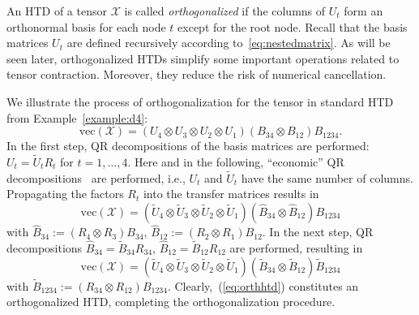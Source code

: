 \documentclass[11pt, a4paper]{article}
\newcommand{\calX}{\mathcal{X}}
\begin{document}
An HTD of a tensor $\calX$ is called \emph{orthogonalized} if the columns of $U_t$
form an orthonormal basis for each node $t$ except for the root node.
Recall that the basis matrices $U_t$ are defined recursively according to~\eqref{eq:nestedmatrix}.
As will be seen later, orthogonalized HTDs simplify some important operations related to tensor contraction. Moreover, they reduce the risk of numerical cancellation.

We illustrate the process of orthogonalization for the tensor in standard
HTD from Example~\ref{example:d4}:
\[\text{vec}(\calX) = 
(U_4\otimes U_3  \otimes U_2\otimes U_1) (B_{34}\otimes B_{12})  B_{1234}.\]
In the first step, QR decompositions of the basis matrices are performed:
$U_t = \widetilde U_t R_t$ for $t = 1,\ldots,4$. Here and in the following, ``economic'' QR
decompositions~\cite{GolV96} are performed, i.e., $U_t$ and $\widetilde U_t$ have the same
number of columns. Propagating the factors $R_t$ into the transfer matrices
results in
\[
\text{vec}(\calX) = 
(\widetilde U_4\otimes \widetilde U_3 \otimes \widetilde U_2\otimes \widetilde U_1) (\widehat B_{34} \otimes \widehat B_{12})  B_{1234}
\]
with $\widehat B_{34} := (R_4\otimes R_3) B_{34}$, $\widehat B_{12} := (R_2\otimes R_1) B_{12}$. In the next step,
QR decompositions $\widehat B_{34} = \widetilde B_{34} R_{34}$,
$\widehat B_{12} = \widetilde B_{12} R_{12}$ are performed, resulting in 
\begin{equation} \label{eq:orthhtd}
\text{vec}(\calX) = 
(\widetilde U_4\otimes \widetilde U_3  \otimes \widetilde U_2\otimes \widetilde U_1) (\widetilde B_{34} \otimes \widetilde B_{12}) \widetilde B_{1234}
\end{equation}
with $\widetilde B_{1234} := (R_{34}\otimes R_{12}) B_{1234}$.  Clearly,~(\ref{eq:orthhtd}) constitutes
an orthogonalized HTD, completing the orthogonalization procedure.
\end{document}
